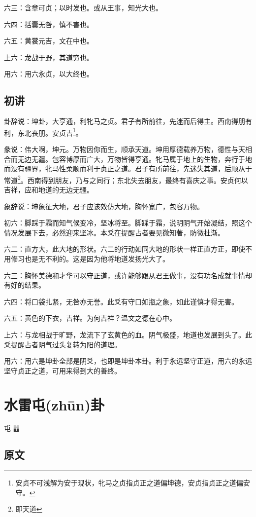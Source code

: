 \documentclass[12pt,oneside]{book}
\begin{document}
六三：含章可贞；以时发也。或从王事，知光大也。

六四：括囊无咎，慎不害也。

六五：黄裳元吉，文在中也。

上六：龙战于野，其道穷也。

用六：用六永贞，以大终也。

\section{初讲}
卦辞说：坤卦，大亨通，利牝马之贞。君子有所前往，先迷而后得主。西南得朋有利，东北丧朋。安贞吉\footnote{安贞不可浅解为安于现状，牝马之贞指贞正之道偏坤德，安贞指贞正之道偏安守。}。

彖说：伟大啊，坤元。万物因你而生，顺承天道。坤用厚德载养万物，德性与天相合而无边无疆。包容博厚而广大，万物皆得亨通。牝马属于地上的生物，奔行于地而没有疆界，牝马性柔顺而利于贞正之道。君子有所前往，先迷失其道，后顺从于常道\footnote{即天道}。西南得到朋友，乃与之同行；东北失去朋友，最终有喜庆之事。安贞何以吉祥，应和地道的无边无疆。

象辞说：坤象征大地，君子应该效仿大地，胸怀宽广，包容万物。


初六：脚踩于霜而知气候变冷，坚冰将至。脚踩于霜，说明阴气开始凝结，照这个情况发展下去，必然迎来坚冰。本爻在提醒占者要见微知著，防微杜渐。

六二：直方大，此大地的形状。六二的行动如同大地的形状一样正直方正，即使不用修习也是无不利的。这是因为他将地道发扬光大了。

六三：胸怀美德和才华可以守正道，或许能够跟从君王做事，没有功名成就事情却有好的结果。

六四：将口袋扎紧，无咎亦无誉。此爻有守口如瓶之象，如此谨慎才得无害。

六五：黄色的下衣，吉祥。为何吉祥？温文之德在心中。

上六：与龙相战于旷野，龙流下了玄黄色的血。阴气极盛，地道也发展到头了。此爻提醒占者阴气过头复转为阳的道理。

用六：用六是坤卦全部是阴爻，也即是坤卦本卦。利于永远坚守正道，用六的永远坚守贞正之道，可用来得到大的善终。





\chapter{水雷屯(zhūn)卦}
屯 {\Large ䷂}

\section{原文}
\end{document}
